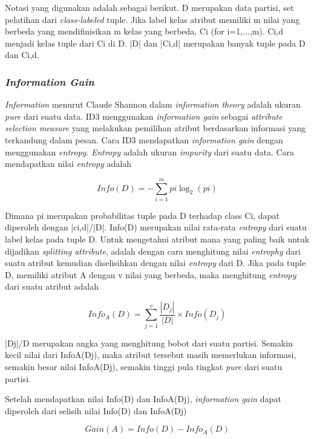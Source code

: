 Notasi yang digunakan adalah sebagai berikut. D merupakan data partisi, set pelatihan dari \textsl{class-labeled} tuple. Jika label kelas atribut memiliki m nilai yang berbeda yang mendifinisikan m kelas yang berbeda, Ci (for i=1,...,m). Ci,d menjadi kelas tuple dari Ci di D. |D| dan |Ci,d| merupakan banyak tuple pada D dan Ci,d.

\subsubsection{\textsl{Information Gain}}
\textsl{Information} menurut Claude Shannon dalam \textsl{information theory} adalah ukuran \textsl{pure} dari suatu data. ID3 menggunakan \textsl{information gain} sebagai \textsl{attribute selection measure} yang melakukan pemilihan atribut berdasarkan informasi yang terkandung dalam pesan. Cara ID3 mendapatkan \textsl{information gain} dengan menggunakan \textsl{entropy}. \textsl{Entropy} adalah ukuran \textsl{impurity} dari suatu data. Cara mendapatkan nilai \textsl{entropy} adalah

\begin{displaymath}
	Info(D) = -\sum_{i=1}^{m} pi \log_2(pi)
\end{displaymath}

Dimana pi merupakan probabilitas tuple pada D terhadap class Ci, dapat diperoleh dengan |ci,d|/|D|. Info(D) merupakan nilai rata-rata \textsl{entropy} dari suatu label kelas pada tuple D. Untuk mengetahui atribut mana yang paling baik untuk dijadikan \textsl{splitting attribute}, adalah dengan cara menghitung nilai \textsl{entrophy} dari suatu atribut kemudian diselisihkan dengan nilai \textsl{entropy} dari D. Jika pada tuple D, memiliki atribut A dengan v nilai yang berbeda, maka menghitung \textsl{entropy} dari suatu atribut adalah

\begin{displaymath}
	Info_A(D) = \sum_{j=1}^v \frac{|D_j|}{|D|} \times Info(D_j)
\end{displaymath}

|Dj|/D merupakan angka yang menghitung bobot dari suatu partisi. Semakin kecil nilai dari InfoA(Dj), maka atribut tersebut masih memerlukan informasi, semakin besar nilai InfoA(Dj), semakin tinggi pula tingkat \textsl{pure} dari suatu partisi.

Setelah mendapatkan nilai Info(D) dan InfoA(Dj), \textsl{information gain} dapat diperoleh dari selisih nilai Info(D) dan InfoA(Dj)

\begin{displaymath}
	Gain(A) = Info(D) - Info_A(D)
\end{displaymath}

